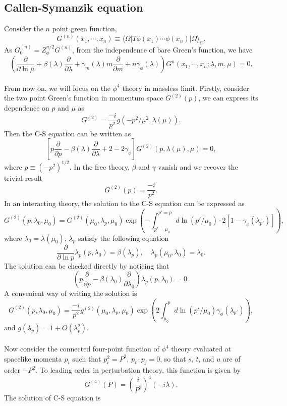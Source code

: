\subsection{Callen-Symanzik equation}
Consider the $n$ point green function,
\[G^{(n)}(x_1,\cdots,x_n) \equiv \langle \Omega | T \phi(x_1) \cdots \phi(x_n) | \Omega \rangle_C .\]
As $G^{(n)}_0 = Z_{\phi}^{n/2} G^{(n)}$, from the independence of bare Green's function, we have
\[\left( \frac{\partial}{\partial \ln \mu} + \beta(\lambda)  \frac{\partial}{\partial \lambda} + \gamma_m(\lambda) m  \frac{\partial}{\partial m} + n \gamma_{\phi}(\lambda)\right)G^{n}(x_1,\cdots,x_n;\lambda,m,\mu) = 0.\]
\\
From now on, we will focus on the $\phi^4$ theory in massless limit. Firstly, consider the two point Green's function in momentum space $G^{(2)}(p)$, we can express its dependence on $p$ and $\mu$ as
\[G^{(2)} = \frac{-i}{p^2} g(-p^2/\mu^2,\lambda(\mu)).\]
Then the C-S equation can be written as
\[\left[ p \frac{\partial}{\partial p} - \beta(\lambda)  \frac{\partial}{\partial \lambda} +2 - 2\gamma_{\phi}\right ] G^{(2)}(p,\lambda(\mu),\mu) = 0 ,\]
where $p \equiv (-p^2)^{1/2}$.
In the free theory, $\beta$ and $\gamma$ vanish and we recover the trivial result
\[G^{(2)}(p) = \frac{-i}{p^2}.\]
In an interacting theory, the solution to the C-S equation can be expressed as
\[G^{(2)}(p,\lambda_0,\mu_0) = G^{(2)}(\mu_0,\lambda_p,\mu_0)\exp \left (-\int_{p'=\mu_0}^{p'=p} d \ln(p'/\mu_0) \cdot 2[1-\gamma_{\phi}(\lambda_{p'})] \right ),\]
where $\lambda_0 = \lambda(\mu_0)$, $\lambda_p$ satisfy the following equation
\[\frac{\partial}{\partial \ln p} \lambda_p(p,\lambda_0) = \beta(\lambda_p) , \quad \lambda_p(\mu_0,\lambda_0) = \lambda_0.\]
The solution can be checked directly by noticing that
\[\left ( p \frac{\partial}{\partial p} - \beta(\lambda_0) \frac{\partial}{\partial \lambda_0} \right ) \lambda_p(p,\lambda_0) = 0.\]
A convenient way of writing the solution is
\[G^{(2)}(p,\lambda_0,\mu_0) =  \frac{-i}{p^2} g^{(2)}(\mu_0,\lambda_p,\mu_0)\exp \left (2\int_{\mu_0}^{p} d \ln(p'/\mu_0)  \gamma_{\phi}(\lambda_{p'}) \right ),\]
and $g(\lambda_p) = 1 + O(\lambda_p^2)$.
\\ \\
Now consider the connected four-point function of $\phi^4$ theory evaluated at spacelike momenta $p_i$ such that $p_i^2= P^2$, $p_i \cdot p_j = 0$, so that $s$, $t$, and $u$ are of order $-P^2$. 
To leading order in perturbation theory, this function is given by
\[G^{(4)}(P) = \left (\frac{i}{P^2}\right )^4 (-i\lambda).\]
The solution of C-S equation is
